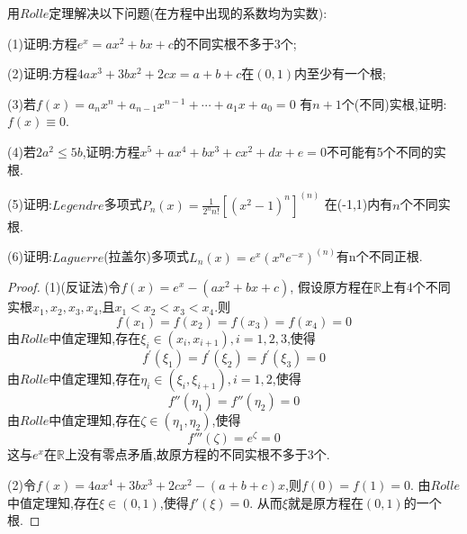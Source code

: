 \documentclass[lang=cn,newtx,10pt,scheme=chinese]{elegantbook}
\begin{document}
\begin{exercise}\label{(ex:2.2)}
    用$Rolle$定理解决以下问题(在方程中出现的系数均为实数):

(1)证明:方程$e^x=ax^2+bx+c$的不同实根不多于3个;

(2)证明:方程$4ax^3+3bx^2+2cx=a+b+c$在$(0,1)$内至少有一个根;

(3)若$f\left( x \right) =a_nx^n+a_{n-1}x^{n-1}+\cdots +a_1x+a_0=0$
有$n+1$个(不同)实根,证明:$f(x)\equiv 0$.

(4)若$2a^2\le 5b$,证明:方程$x^5+ax^4+bx^3+cx^2+dx+e=0$不可能有5个不同的实根.

(5)证明:$Legendre$多项式$P_n\left( x \right) =\frac{1}{2^nn!}\left[ \left( x^2-1 \right) ^n \right] ^{\left( n \right)}$
在(-1,1)内有$n$个不同实根.

(6)证明:$Laguerre$(拉盖尔)多项式$L_n\left( x \right) =e^x\left( x^ne^{-x} \right) ^{\left( n \right)}$有n个不同正根.

\begin{proof}
    (1)(反证法)令$f(x)=e^x-(ax^2+bx+c)$,
    假设原方程在$\mathbb{R}$上有4个不同实根$x_1,x_2,x_3,x_4$,且$x_1<x_2<x_3<x_4$.则
    \begin{equation}
        f(x_1)=f(x_2)=f(x_3)=f(x_4)=0
        \nonumber
    \end{equation}
    由$Rolle$中值定理知,存在$\xi_i\in(x_i,x_{i+1}),i=1,2,3$,使得
    \begin{equation}
        f^{\prime}(\xi_1)=f^{\prime}(\xi_2)=f^{\prime}(\xi_3)=0
        \nonumber
    \end{equation}
    由$Rolle$中值定理知,存在$\eta_i\in(\xi_i,\xi_{i+1}),i=1,2$,使得
    \begin{equation}
        f''(\eta_1)=f''(\eta_2)=0
        \nonumber
    \end{equation}
    由$Rolle$中值定理知,存在$\zeta\in(\eta_1,\eta_2)$,使得
    \begin{equation}
        f'''(\zeta)=e^\zeta=0
        \nonumber
    \end{equation}
    这与$e^x$在$\mathbb{R}$上没有零点矛盾,故原方程的不同实根不多于3个.

    (2)令$f(x)=4ax^4+3bx^3+2cx^2-(a+b+c)x$,则$f(0)=f(1)=0$.
    由$Rolle$中值定理知,存在$\xi\in(0,1)$,使得$f'(\xi)=0$.
    从而$\xi$就是原方程在$(0,1)$的一个根.


\end{proof}
\end{exercise}
\end{document}

